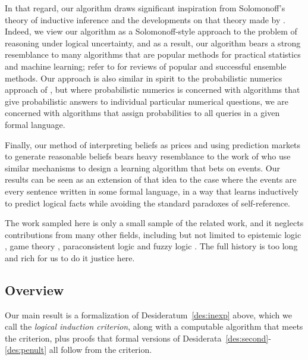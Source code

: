 \documentclass[authordate,onecolumn,noenvironments]{miri-tech-article}
\numberwithin{equation}{subsection}
\newcommand{\Des}[1]{Desideratum~\ref{des:#1}}
\newcommand{\lic}{logical induction criterion}
\begin{document}
In that regard, our algorithm draws significant inspiration from Solomonoff's theory of inductive inference \citep{Solomonoff:1964,Solomonoff:1964a} and the developments on that theory made by \citet{zvonkin1970complexity,Li:1993}. Indeed, we view our algorithm as a Solomonoff-style approach to the problem of reasoning under logical uncertainty, and as a result, our algorithm bears a strong resemblance to many algorithms that are popular methods for practical statistics and machine learning; refer to \citet{opitz1999popular,dietterich2000ensemble} for reviews of popular and successful ensemble methods. Our approach is also similar in spirit to the probabilistic numerics approach of \citet{briol2015probabilistic}, but where probabilistic numerics is concerned with algorithms that give probabilistic answers to individual particular numerical questions, we are concerned with algorithms that assign probabilities to all queries in a given formal language. 

Finally, our method of interpreting beliefs as prices and using prediction markets to generate reasonable beliefs bears heavy resemblance to the work of \citet{beygelzimer2012learning}
who use similar mechanisms to design a learning algorithm that bets on events. Our results can be seen as an extension of that idea to the case where the events are every sentence written in some formal language, in a way that learns inductively to predict logical facts while avoiding the standard paradoxes of self-reference.

The work sampled here is only a small sample of the related work, and it neglects contributions from many other fields, including but not limited to epistemic logic \citep{gardenfors1988knowledge,meyer2004epistemic,schlesinger1985range,sowa1999knowledge,guarino1998formal}, game theory \citep{rantala1979urn,hintikka1979impossible,bacharach1994epistemic,lipman1991decide,battigalli1999recent,binmore1992foundations}, paraconsistent logic \citep{
blair1989paraconsistent,priest2002paraconsistent,mortensen2013inconsistent,fuhrmann2013relevant,akama2016paraconsistent} and fuzzy logic \citep{klir1995fuzzy,yen1999fuzzy,gerla2013fuzzy}. The full history is too long and rich for us to do it justice here.






\subsection{Overview}\label{sec:overview}
Our main result is a formalization of \Des{inexp} above, which we call the \emph{\lic{}}, along with a computable algorithm that meets the criterion, plus proofs that formal versions of Desiderata~\ref{des:second}-\ref{des:penult} all follow from the criterion.
\end{document}
